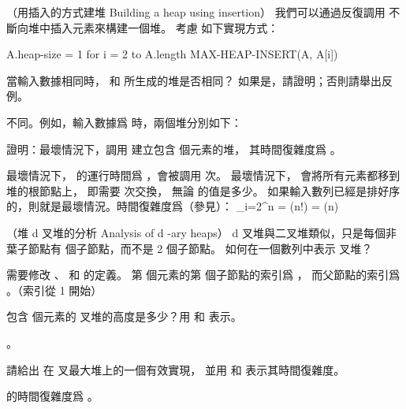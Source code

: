 \startsubject[
  title={Problems},
]

\startPROBLEM
（用插入的方式建堆 Building a heap using insertion）
我們可以通過反復調用  不斷向堆中插入元素來構建一個堆。
考慮  如下實現方式：

\startCLRS
A.heap-size = 1
for i = 2 to A.length
	MAX-HEAP-INSERT(A, A[i])
\stopCLRS

\startigBase[a]
\startitem
當輸入數據相同時，  和  所生成的堆是否相同？
如果是，請證明；否則請舉出反例。

\startANSWER
不同。例如，輸入數據爲  時，兩個堆分別如下：

\startcombination[2*1]
{\externalfigure[output/p6_1_a-1]}{}
{\externalfigure[output/p6_1_a-2]}{}
\stopcombination

\stopANSWER
\stopitem
\startitem
證明：最壞情況下，調用  建立包含  個元素的堆，
其時間復雜度爲 。

\startANSWER
最壞情況下，  的運行時間爲 ，會被調用  次。
最壞情況下，  會將所有元素都移到堆的根節點上， 即需要  次交換，
無論  的值是多少。
如果輸入數列已經是排好序的，則就是最壞情況。時間復雜度爲（參見\inexercise[lg_n_fac]）：
\startformula
\sum_{i=2}^{n} = \lg(n!) = \Theta(n)
\stopformula
\stopANSWER
\stopitem
\stopigBase
\stopPROBLEM

\startPROBLEM[problem:6-2]
（堆 d 叉堆的分析 Analysis of d -ary heaps）
d 叉堆與二叉堆類似，只是每個非葉子節點有  個子節點，而不是 2 個子節點。
\startigBase[a]
\startitem
如何在一個數列中表示  叉堆？

\startANSWER
需要修改 、  和  的定義。
第  個元素的第  個子節點的索引爲 ，
而父節點的索引爲 。（索引從 1 開始）
\stopANSWER
\stopitem

\startitem
包含  個元素的  叉堆的高度是多少？用  和  表示。

\startANSWER
{}。
\stopANSWER
\stopitem

\startitem
請給出  在  叉最大堆上的一個有效實現，
並用  和  表示其時間復雜度。

\startANSWER
{} 的時間復雜度爲 。
\stopANSWER
\stopitem

